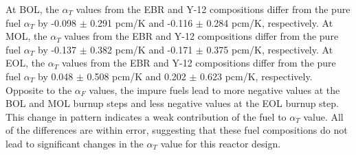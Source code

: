 At \gls*{BOL}, the $\alpha_T$ values from the \gls*{EBR} and Y-12 compositions 
differ from the pure fuel $\alpha_T$ by -0.098 $\pm$ 0.291 pcm/K and 
-0.116 $\pm$ 0.284 pcm/K, respectively. At \gls*{MOL}, the $\alpha_T$ 
values from the \gls*{EBR} and Y-12 compositions 
differ from the pure fuel $\alpha_T$ by -0.137 $\pm$ 0.382 pcm/K and 
-0.171 $\pm$ 0.375 pcm/K, respectively. At \gls*{EOL}, the $\alpha_T$ 
values from the \gls*{EBR} and Y-12 compositions 
differ from the pure fuel $\alpha_T$ by 0.048 $\pm$ 0.508 pcm/K and 
0.202 $\pm$ 0.623 pcm/K, respectively. Opposite to the 
$\alpha_F$ values, the impure fuels lead to more 
negative values at the \gls*{BOL} and \gls*{MOL} burnup steps 
and less negative values at the \gls*{EOL} burnup step.
This change in pattern indicates a weak contribution of 
the fuel to $\alpha_T$ value.  
All of the differences are within error, 
suggesting that these fuel compositions do not lead to 
significant changes in the $\alpha_T$ value for this reactor
design. 

